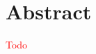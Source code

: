 \documentclass[../main.tex]{subfiles}
\begin{document}
\section*{Abstract}

\textcolor{red}{Todo}
\end{document}
